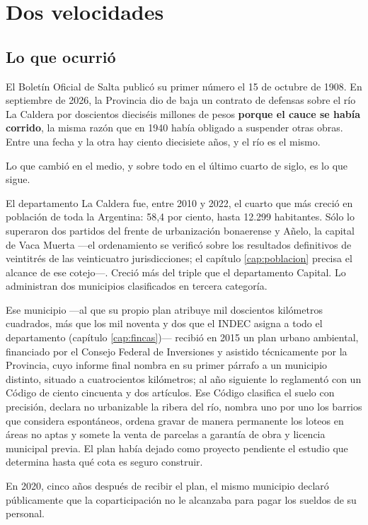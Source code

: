 \chapter{Dos velocidades}

\label{cap:conclusion}
\section{Lo que ocurrió}

El Boletín Oficial de Salta publicó su primer número el 15 de octubre de 1908. En septiembre de 2026, la Provincia dio de baja un contrato de defensas sobre el río La Caldera por doscientos dieciséis millones de pesos \textbf{porque el cauce se había corrido}, la misma razón que en 1940 había obligado a suspender otras obras. Entre una fecha y la otra hay ciento diecisiete años, y el río es el mismo.

Lo que cambió en el medio, y sobre todo en el último cuarto de siglo, es lo que sigue.

El departamento La Caldera fue, entre 2010 y 2022, el cuarto que más creció en población de toda la Argentina: 58,4 por ciento, hasta 12.299 habitantes. Sólo lo superaron dos partidos del frente de urbanización bonaerense y Añelo, la capital de Vaca Muerta ---el ordenamiento se verificó sobre los resultados definitivos de veintitrés de las veinticuatro jurisdicciones; el capítulo \ref{cap:poblacion} precisa el alcance de ese cotejo---. Creció más del triple que el departamento Capital. Lo administran dos municipios clasificados en tercera categoría.

Ese municipio ---al que su propio plan atribuye mil doscientos kilómetros cuadrados, más que los mil noventa y dos que el INDEC asigna a todo el departamento (capítulo \ref{cap:fincas})--- recibió en 2015 un plan urbano ambiental, financiado por el Consejo Federal de Inversiones y asistido técnicamente por la Provincia, cuyo informe final nombra en su primer párrafo a un municipio distinto, situado a cuatrocientos kilómetros; al año siguiente lo reglamentó con un Código de ciento cincuenta y dos artículos. Ese Código clasifica el suelo con precisión, declara no urbanizable la ribera del río, nombra uno por uno los barrios que considera espontáneos, ordena gravar de manera permanente los loteos en áreas no aptas y somete la venta de parcelas a garantía de obra y licencia municipal previa. El plan había dejado como proyecto pendiente el estudio que determina hasta qué cota es seguro construir.

En 2020, cinco años después de recibir el plan, el mismo municipio declaró públicamente que la coparticipación no le alcanzaba para pagar los sueldos de su personal.

